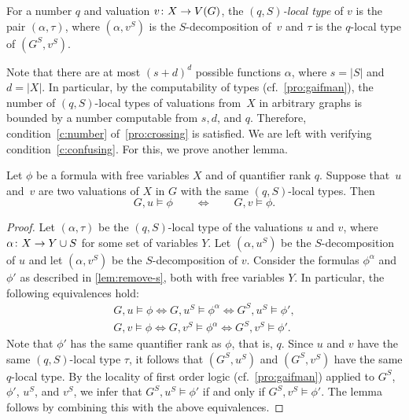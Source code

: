 \begin{definition}\label{def:}
For a number $q$ and valuation $v\colon X \to V(G)$, the \emph{$(q,S)$-local type} of $v$ 
is the pair $(\alpha,\tau)$,
where $(\alpha,v^S)$ is the $S$-decomposition of~$v$
and $\tau$ is the $q$-local type of   $(G^S,v^S)$.	
\end{definition}
Note that there are at most  $(s+d)^d$ possible functions $\alpha$, where $s=|S|$ and $d=|X|$. In particular, by the computability of types (cf.~\cref{pro:gaifman}), 
the number of $(q,S)$-local types of valuations from~$X$
in arbitrary graphs is bounded by 
a number computable from $s,d$, and $q$.
Therefore, condition~\eqref{c:number} of~\cref{pro:crossing} is satisfied. We are left with verifying condition~\eqref{c:confusing}. For this, we prove another lemma.





\begin{lemma}\label{lem:coloring}
	Let $\phi$ be a formula with
free variables $X$ and of quantifier rank $q$.
	Suppose that~$u$ and~$v$ are two valuations of $X$  in $G$ with the same $(q,S)$-local types.
	Then $$G,u\models \phi\qquad \iff\qquad G,v\models \phi.$$
\end{lemma}
\begin{proof}
Let $(\alpha,\tau)$ be the $(q,S)$-local type of the valuations $u$ and $v$, where $\alpha\colon X\to Y\cup S$ for some set of variables $Y$. Let $(\alpha,u^S)$ be the $S$-decomposition of $u$
and let $(\alpha,v^S)$ be the $S$-decomposition of $v$.
	Consider the formulas $\phi^{\alpha}$ and $\phi'$ as described in \cref{lem:remove-s}, both with free variables $Y$.
	In particular, the following equivalences hold:
	\begin{align*}
	G,u\models\phi\iff G,u^S\models\phi^{\alpha}\iff G^S,u^S\models\phi',\\
	G,v\models\phi\iff G,v^S\models\phi^{\alpha}\iff G^S,v^S\models\phi'.
	\end{align*}
		Note that $\phi'$ has the same quantifier rank as  $\phi$, that is, $q$.
		Since $u$ and $ v$ have the same $(q,S)$-local type $\tau$, it follows that $(G^S,u^S)$ and $(G^S,v^S)$ have the same   $q$-local type.
		By the locality of first order logic (cf.~\cref{pro:gaifman}) applied to $G^S$, $\phi'$, $ u^S$, and $v^S$, we infer that $G^S,u^S\models\phi'$ if and only if $G^S,v^S\models\phi'$.
		The lemma follows by combining this with the above equivalences.
\end{proof}

